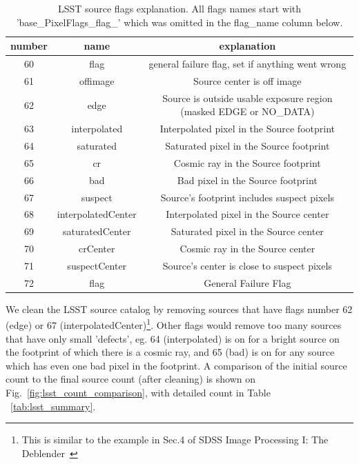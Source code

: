 \documentclass[DM,lsstdraft,toc,usenatbib]{lsstdoc}
\begin{document}
\begin{table}
\centering
\caption{LSST source flags explanation. All flags names start with 'base\_PixelFlags\_flag\_' which was omitted in the flag\_name column below. }
\label{tab:lsst_src_flags}
\begin{tabular}{ccc}
\hline
number & name & explanation \\
\hline
60 & flag & general failure flag, set if anything went wrong \\
61 & offimage & Source center is off image \\
62 & edge & Source is outside usable exposure region (masked EDGE or NO\_DATA) \\
63 & interpolated & Interpolated pixel in the Source footprint \\
64 & saturated & Saturated pixel in the Source footprint \\
65 & cr & Cosmic ray in the Source footprint \\
66 & bad & Bad pixel in the Source footprint \\
67 & suspect & Source's footprint includes suspect pixels \\
68 & interpolatedCenter & Interpolated pixel in the Source center \\
69 & saturatedCenter & Saturated pixel in the Source center \\
70 & crCenter & Cosmic ray in the Source center \\
71 & suspectCenter & Source's center is close to suspect pixels \\
72 & flag & General Failure Flag \\
\hline
\end{tabular}
\end{table}

We clean the LSST source catalog by removing sources that have flags number 62 (edge) or 67 (interpolatedCenter)\footnote{This is similar to the example in Sec.4 of SDSS Image Processing I: The Deblender~\citep{lupton2005}}. Other flags would remove too many sources that have only small 'defects', eg. 64 (interpolated) is on for a bright source on the footprint of which there is a cosmic ray, and 65 (bad) is on for any source which has even one bad pixel in the footprint. A comparison of the initial source count to the final source count (after cleaning) is shown on Fig.~\ref{fig:lsst_count_comparison}, with detailed count in  Table ~\ref{tab:lsst_summary}.
\end{document}
